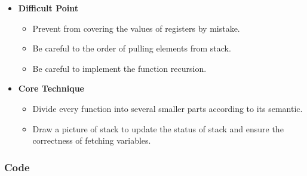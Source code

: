 \documentclass{article}
\begin{document}
\begin{itemize}
	\item \textbf{Difficult Point}
		\begin{itemize}
			\item Prevent from covering the values of registers by mistake.
			\item Be careful to the order of pulling elements from stack.
			\item Be careful to implement the function recursion.
		\end{itemize}
	\item \textbf{Core Technique}
		\begin{itemize}
			\item Divide every function into several smaller parts according to its semantic.
			\item Draw a picture of stack to update the status of stack and ensure the correctness of fetching variables.
		\end{itemize}
\end{itemize}
\subsubsection{Code}
\end{document}
